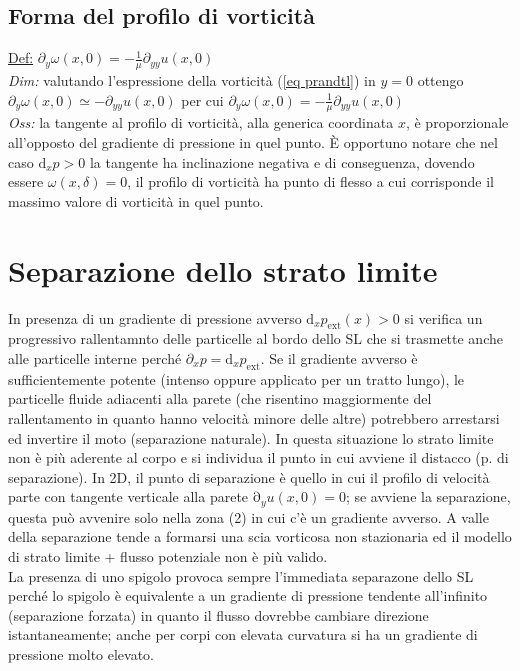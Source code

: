\documentclass[11pt,a4paper]{report}
\newcommand{\de}{\mathrm d}
\begin{document}
{		\subsection{Forma del profilo di vorticità}
		\underline{Def:} $\partial_y\omega(x,0)=-\frac 1\mu\partial_{yy}u(x,0)$\\
		\textit{Dim:} valutando l'espressione della vorticità (\ref{eq prandtl}) in $y=0$ ottengo $\partial_y\omega(x,0)\simeq-\partial_{yy}u(x,0)$ per cui $\partial_y\omega(x,0)=-\frac 1\mu\partial_{yy}u(x,0)$\\
		\textit{Oss:} la tangente al profilo di vorticità, alla generica coordinata $x$, è proporzionale all'opposto del gradiente di pressione in quel punto. È opportuno notare che nel caso $\de _xp>0$ la tangente ha inclinazione negativa e di conseguenza, dovendo essere $\omega(x,\delta)=0$, il profilo di vorticità ha punto di flesso a cui corrisponde il massimo valore di vorticità in quel punto.

	\section{Separazione dello strato limite}
	In presenza di un gradiente di pressione avverso $\de _xp_\mathrm{ext}(x)>0$ si verifica un progressivo rallentamnto delle particelle al bordo dello SL che si trasmette anche alle particelle interne perché $\partial_xp=\de _xp_\mathrm{ext}$. Se il gradiente avverso è sufficientemente potente (intenso oppure applicato per un tratto lungo), le particelle fluide adiacenti alla parete (che risentino maggiormente del rallentamento in quanto hanno velocità minore delle altre) potrebbero arrestarsi ed invertire il moto (separazione naturale). In questa situazione lo strato limite non è più aderente al corpo e si individua il punto in cui avviene il distacco (p. di separazione). In 2D, il punto di separazione è quello in cui il profilo di velocità parte con tangente verticale alla parete $\mathrm \partial_yu(x,0)=0$; se avviene la separazione, questa può avvenire solo nella zona (2) in cui c'è un gradiente avverso. A valle della separazione tende a formarsi una scia vorticosa non stazionaria ed il modello di strato limite + flusso potenziale non è più valido.\\
	La presenza di uno spigolo provoca sempre l'immediata separazone dello SL perché lo spigolo è equivalente a un gradiente di pressione tendente all'infinito (separazione forzata) in quanto il flusso dovrebbe cambiare direzione istantaneamente; anche per corpi con elevata curvatura si ha un gradiente di pressione molto elevato.
}
\end{document}
